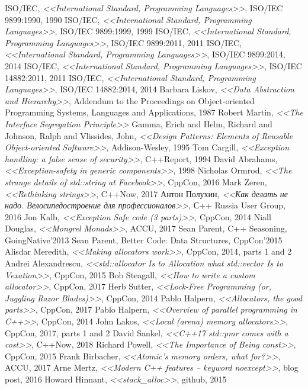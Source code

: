 \documentclass[a4paper,12pt,oneside]{book}
\begin{document}
\begin{thebibliography}{99}
 ISO/IEC, \textit{<<International Standard, Programming Languages>>}, ISO/IEC 9899:1990, 1990
 ISO/IEC, \textit{<<International Standard, Programming Languages>>}, ISO/IEC 9899:1999, 1999
 ISO/IEC, \textit{<<International Standard, Programming Languages>>}, ISO/IEC 9899:2011, 2011
 ISO/IEC, \textit{<<International Standard, Programming Languages>>}, ISO/IEC 9899:2014, 2014
 ISO/IEC, \textit{<<International Standard, Programming Languages>>}, ISO/IEC 14882:2011, 2011
 ISO/IEC, \textit{<<International Standard, Programming Languages>>}, ISO/IEC 14882:2014, 2014
 Barbara Liskov, \textit{<<Data Abstraction and Hierarchy>>}, Addendum to the Proceedings on Object-oriented Programming Systems, Languages and Applications, 1987
 Robert Martin, \textit{<<The Interface Segregation Principle>>}
 Gamma, Erich and Helm, Richard and Johnson, Ralph and Vlissides, John, \textit{<<Design Patterns: Elements of Reusable Object-oriented Software>>}, Addison-Wesley, 1995
 Tom Cargill, \textit{<<Exception handling: a false sense of security>>}, C++Report, 1994
 David Abrahams, \textit{<<Exception-safety in generic components>>}, 1998
 Nicholas Ormrod, \textit{<<The strange details of std::string at Facebook>>}, CppCon, 2016
 Mark Zeren, \textit{<<Rethinking strings>>}, C++Now, 2017
 Антон Полухин, \textit{<<Как делать не надо. Велосипедостроение для профессионалов>>}, С++ Russia User Group, 2016
 Jon Kalb, \textit{<<Exception Safe code (3 parts)>>}, CppCon, 2014
 Niall Douglas, \textit{<<Mongrel Monads>>}, ACCU, 2017
 Sean Parent, C++ Seasoning, GoingNative'2013
 Sean Parent, Better Code: Data Structures, CppCon'2015
 Alisdar Meredith, \textit{<<Making allocators work>>}, CppCon, 2014, parts 1 and 2
 Andrei Alexandrescu, \textit{<<std::allocator Is to Allocation what std::vector Is to Vexation>>}, CppCon, 2015
 Bob Steagall, \textit{<<How to write a custom allocator>>}, CppCon, 2017
 Herb Sutter, \textit{<<Lock-Free Programming (or, Juggling Razor Blades)>>}, CppCon, 2014
 Pablo Halpern, \textit{<<Allocators, the good parts>>}, CppCon, 2017
 Pablo Halpern, \textit{<<Overview of parallel programming in C++>>}, CppCon, 2014
 John Lakos,  \textit{<<Local (arena) memory allocators>>}, CppCon, 2017, parts 1 and 2
 David Sankel, \textit{<<C++17 std::pmr comes with a cost>>}, C++Now, 2018
 Richard Powell, \textit{<<The Importance of Being const>>}, CppCon, 2015
 Frank Birbacher, \textit{<<Atomic’s memory orders, what for?>>}, ACCU, 2017
 Arne Mertz, \textit{<<Modern C++ features – keyword noexcept>>}, blog post, 2016
 Howard Hinnant, \textit{<<stack\_alloc>>}, github, 2015
\end{thebibliography}
\end{document}
